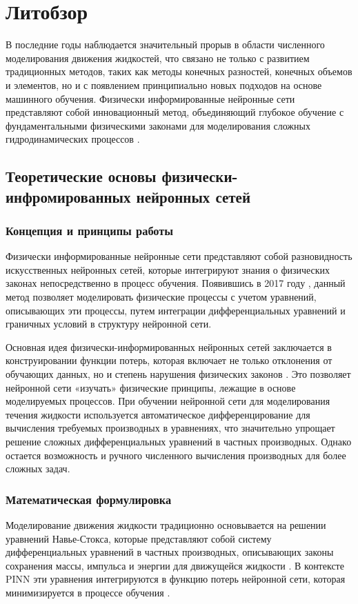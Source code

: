 \chapter{Литобзор}

В последние годы наблюдается значительный прорыв в области численного моделирования движения жидкостей,
что связано не только с развитием традиционных методов, таких как методы конечных разностей, конечных
объемов и элементов, но и с появлением принципиально новых подходов на основе машинного обучения.
Физически информированные нейронные сети представляют собой
инновационный метод, объединяющий глубокое обучение с фундаментальными физическими законами для
моделирования сложных гидродинамических процессов \cite{raissi2019physics}.

\section{Теоретические основы физически-инфромированных нейронных сетей}
\subsection{Концепция и принципы работы}
Физически информированные нейронные сети представляют собой разновидность искусственных нейронных сетей,
которые интегрируют знания о физических законах непосредственно в процесс обучения. Появившись в 2017
году \cite{raissi2017physics}, данный метод позволяет моделировать физические процессы с учетом уравнений,
описывающих эти процессы, путем интеграции дифференциальных уравнений и граничных условий в структуру
нейронной сети.

Основная идея физически-информированных нейронных сетей заключается в конструировании функции потерь,
которая включает не только отклонения
от обучающих данных, но и степень нарушения физических законов \cite{karniadakis2021physics}. Это
позволяет нейронной сети «изучать» физические принципы, лежащие в основе моделируемых процессов. При
обучении нейронной сети для моделирования течения жидкости используется автоматическое дифференцирование для
вычисления требуемых производных в уравнениях, что значительно упрощает решение сложных дифференциальных
уравнений в частных производных. Однако остается возможность и ручного численного вычисления производных
для более сложных задач.

\subsection{Математическая формулировка}
Моделирование движения жидкости традиционно основывается на решении уравнений Навье-Стокса, которые
представляют собой систему дифференциальных уравнений в частных производных, описывающих законы сохранения
массы, импульса и энергии для движущейся жидкости \cite{batchelor2000introduction}. В контексте PINN эти
уравнения интегрируются в функцию потерь нейронной сети, которая минимизируется в процессе
обучения \cite{yang2019adversarial}.

